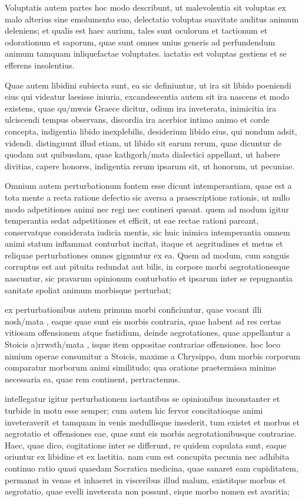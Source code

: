  Voluptatis autem partes hoc modo describunt, ut malevolentia sit voluptas ex malo alterius sine emolumento suo, delectatio voluptas suavitate auditus animum deleniens; et qualis est haec aurium, tales sunt oculorum et tactionum et odorationum et saporum, quae sunt omnes unius generis ad perfundendum animum tamquam inliquefactae voluptates. iactatio est voluptas gestiens et se efferens insolentius.

 Quae autem libidini subiecta sunt, ea sic definiuntur, ut ira sit libido poeniendi eius qui videatur laesisse iniuria, excandescentia autem sit ira nascens et modo existens, quae qu/mwsis Graece dicitur, odium ira inveterata, inimicitia ira ulciscendi tempus observans, discordia ira acerbior intimo animo et corde concepta, indigentia libido inexplebilis, desiderium libido eius, qui nondum adsit, videndi. distinguunt illud etiam, ut libido sit earum rerum, quae dicuntur de quodam aut quibusdam, quae kathgorh/mata dialectici appellant, ut habere divitias, capere honores, indigentia rerum ipsarum sit, ut honorum, ut pecuniae.

 Omnium autem perturbationum fontem esse dicunt intemperantiam, quae est a tota mente a recta ratione defectio sic aversa a praescriptione rationis, ut nullo modo adpetitiones animi nec regi nec contineri queant. quem ad modum igitur temperantia sedat adpetitiones et efficit, ut eae rectae rationi pareant, conservatque considerata iudicia mentis, sic huic inimica intemperantia omnem animi statum inflammat conturbat incitat, itaque et aegritudines et metus et reliquae perturbationes omnes gignuntur ex ea. Quem ad modum, cum sanguis corruptus est aut pituita redundat aut bilis, in corpore morbi aegrotationesque nascuntur, sic pravarum opinionum conturbatio et ipsarum inter se repugnantia sanitate spoliat animum morbisque perturbat;

 ex perturbationibus autem primum morbi conficiuntur, quae vocant illi nosh/mata , eaque quae sunt eis morbis contraria, quae habent ad res certas vitiosam offensionem atque fastidium, deinde aegrotationes, quae appellantur a Stoicis a)rrwsth/mata , isque item oppositae contrariae offensiones. hoc loco nimium operae consumitur a Stoicis, maxime a Chrysippo, dum morbis corporum comparatur morborum animi similitudo; qua oratione praetermissa minime necessaria ea, quae rem continent, pertractemus.

 intellegatur igitur perturbationem iactantibus se opinionibus inconstanter et turbide in motu esse semper; cum autem hic fervor concitatioque animi inveteraverit et tamquam in venis medullisque insederit, tum existet et morbus et aegrotatio et offensiones eae, quae sunt eis morbis aegrotationibusque contrariae. Haec, quae dico, cogitatione inter se differunt, re quidem copulata sunt, eaque oriuntur ex libidine et ex laetitia. nam cum est concupita pecunia nec adhibita continuo ratio quasi quaedam Socratica medicina, quae sanaret eam cupiditatem, permanat in venas et inhaeret in visceribus illud malum, existitque morbus et aegrotatio, quae evelli inveterata non possunt, eique morbo nomen est avaritia;

